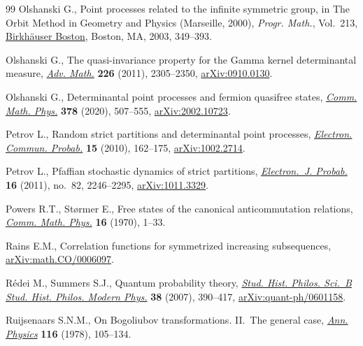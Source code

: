 \documentclass[pdftex]{sigma}
\numberwithin{equation}{section}
\begin{document}
\begin{thebibliography}{99}
Olshanski G., Point processes related to the infinite symmetric group, in The
 Orbit Method in Geometry and Physics ({M}arseille, 2000), \textit{Progr.
 Math.}, Vol.~213, \href{https://doi.org/10.1007/978-1-4612-0029-1_15}{Birkh\"auser Boston}, Boston, MA, 2003, 349--393.

Olshanski G., The quasi-invariance property for the {G}amma kernel
 determinantal measure, \href{https://doi.org/10.1016/j.aim.2010.09.015}{\textit{Adv. Math.}} \textbf{226} (2011), 2305--2350,
 \href{https://arxiv.org/abs/0910.0130}{arXiv:0910.0130}.

Olshanski G., Determinantal point processes and fermion quasifree states,
 \href{https://doi.org/10.1007/s00220-020-03716-1}{\textit{Comm. Math. Phys.}} \textbf{378} (2020), 507--555,
 \href{https://arxiv.org/abs/2002.10723}{arXiv:2002.10723}.

Petrov L., Random strict partitions and determinantal point processes,
 \href{https://doi.org/10.1214/ECP.v15-1542}{\textit{Electron. Commun. Probab.}} \textbf{15} (2010), 162--175,
 \href{https://arxiv.org/abs/1002.2714}{arXiv:1002.2714}.

Petrov L., Pfaffian stochastic dynamics of strict partitions,
 \href{https://doi.org/10.1214/EJP.v16-956}{\textit{Electron.~J. Probab.}} \textbf{16} (2011), no.~82, 2246--2295,
 \href{https://arxiv.org/abs/1011.3329}{arXiv:1011.3329}.

Powers R.T., St{\o}rmer E., Free states of the canonical anticommutation
 relations, \href{https://doi.org/10.1007/BF01645492}{\textit{Comm. Math. Phys.}} \textbf{16} (1970), 1--33.

Rains E.M., Correlation functions for symmetrized increasing subsequences,
 \href{https://arxiv.org/abs/math.CO/0006097}{arXiv:math.CO/0006097}.

R\'edei M., Summers S.J., Quantum probability theory, \href{https://doi.org/10.1016/j.shpsb.2006.05.006}{\textit{Stud. Hist.
 Philos. Sci.~B Stud. Hist. Philos. Modern Phys.}} \textbf{38} (2007),
 390--417, \href{https://arxiv.org/abs/quant-ph/0601158}{arXiv:quant-ph/0601158}.

Ruijsenaars S.N.M., On {B}ogoliubov transformations. {II}.~{T}he general case,
 \href{https://doi.org/10.1016/0003-4916(78)90006-4}{\textit{Ann. Physics}} \textbf{116} (1978), 105--134.


\end{thebibliography}
\end{document}
